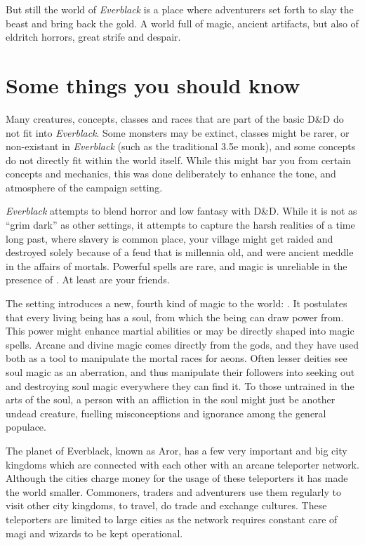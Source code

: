 But still the world of \emph{Everblack} is a place where adventurers set forth
to slay the beast and bring back the gold. A world full of magic, ancient
artifacts, but also of eldritch horrors, great strife and despair.

\section{Some things you should know}

\begin{enumerate}
  Many creatures, concepts, classes and
 races that are part of the basic D\&D do not fit into \emph{Everblack}. Some
 monsters may be extinct, classes might be rarer, or non-existant in
 \emph{Everblack} (such as the traditional 3.5e monk), and some concepts do
 not directly fit within the world itself. While this might bar you from
 certain concepts and mechanics, this was done deliberately to enhance the
 tone, and atmosphere of the campaign setting.

  \emph{Everblack} attempts to blend horror and low fantasy
 with D\&D. While it is not as ``grim dark'' as other settings, it attempts to
 capture the harsh realities of a time long past, where slavery is common place,
 your village might get raided and destroyed solely because of a feud that is
 millennia old, and were ancient  meddle in the affairs
 of mortals. Powerful spells are rare, and magic is unreliable in the presence
 of . At least  are your friends.

  The setting introduces a new, fourth kind of magic to the
 world: . It postulates that every living being has a
 soul, from which the being can draw power from. This power might enhance
 martial abilities or may be directly shaped into magic spells. Arcane and
 divine magic comes directly from the gods, and they have used both as a tool
 to manipulate the mortal races for aeons. Often lesser deities see soul magic
 as an aberration, and thus manipulate their followers into seeking out and
 destroying soul magic everywhere they can find it. To those untrained in the
 arts of the soul, a person with an affliction in the soul might just be
 another undead creature, fuelling misconceptions and ignorance among the
 general populace.

  The planet of Everblack, known as Aror, has a
 few very important and big city kingdoms which are connected with each other
 with an arcane teleporter network. Although the cities charge money for the
 usage of these teleporters it has made the world smaller. Commoners, traders
 and adventurers use them regularly to visit other city kingdoms, to travel,
 do trade and exchange cultures. These teleporters are limited to large cities
 as the network requires constant care of magi and wizards to be kept
 operational.


\end{enumerate}
